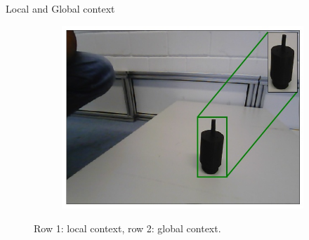 \documentclass{beamer}
\begin{document}
\begin{frame}{Local and Global context}
\begin{figure}[h]
\begin{subfigure}{.49\textwidth}
			\label{Fig:em01g}
		\end{subfigure}
		\begin{subfigure}{.49\textwidth}
			\centering
			\includegraphics[width=.6\linewidth]{images/motor_context_g}
			\label{Fig:motorg}
		\end{subfigure}
		\captionsetup{justification=centering,margin=0.2cm}
		\caption{Row 1: local context, row 2: global context.}
		\label{Fig:context}
	\end{figure}

\end{frame}
\end{document}
